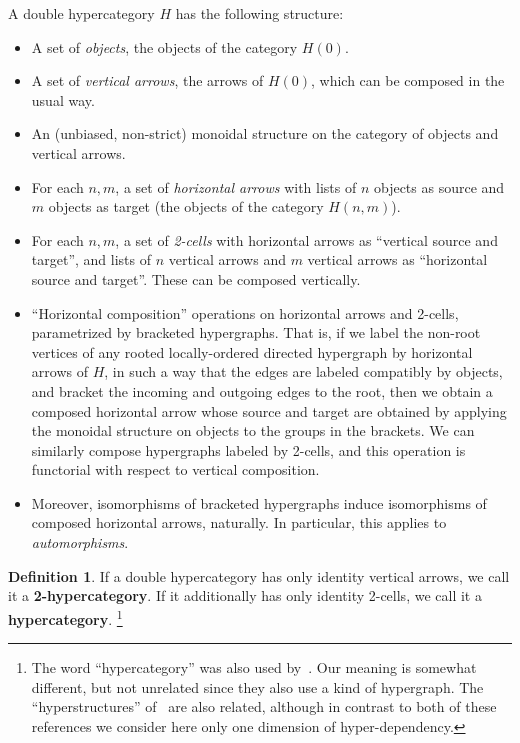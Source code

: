 \documentclass{article}
\theoremstyle{definition}
\newtheorem{defn}[thm]{Definition}
\theoremstyle{remark}
\begin{document}
A double hypercategory $H$ has the following structure:
\begin{itemize}
\item A set of \emph{objects}, the objects of the category $H(0)$.
\item A set of \emph{vertical arrows}, the arrows of $H(0)$, which can be composed in the usual way.
\item An (unbiased, non-strict) monoidal structure on the category of objects and vertical arrows.
\item For each $n,m$, a set of \emph{horizontal arrows} with lists of $n$ objects as source and $m$ objects as target (the objects of the category $H(n,m)$).
\item For each $n,m$, a set of \emph{2-cells} with horizontal arrows as ``vertical source and target'', and lists of $n$ vertical arrows and $m$ vertical arrows as ``horizontal source and target''.
  These can be composed vertically.
\item ``Horizontal composition'' operations on horizontal arrows and 2-cells, parametrized by bracketed hypergraphs.
  That is, if we label the non-root vertices of any rooted locally-ordered directed hypergraph by horizontal arrows of $H$, in such a way that the edges are labeled compatibly by objects, and bracket the incoming and outgoing edges to the root, then we obtain a composed horizontal arrow whose source and target are obtained by applying the monoidal structure on objects to the groups in the brackets.
  We can similarly compose hypergraphs labeled by 2-cells, and this operation is functorial with respect to vertical composition.
\item Moreover, isomorphisms of bracketed hypergraphs induce isomorphisms of composed horizontal arrows, naturally.
  In particular, this applies to \emph{automorphisms}.
\end{itemize}

\begin{defn}
  If a double hypercategory has only identity vertical arrows, we call it a \textbf{2-hypercategory}.
  If it additionally has only identity 2-cells, we call it a \textbf{hypercategory}.%
  \footnote{The word ``hypercategory'' was also used by~\cite{hmt:strict-n-hypercats,mt:omega-hypergraphs}.
    Our meaning is somewhat different, but not unrelated since they also use a kind of hypergraph.
    The ``hyperstructures'' of~\cite{baas:higher-structures} are also related, although in contrast to both of these references we consider here only one dimension of hyper-dependency.}
\end{defn}
\end{document}
